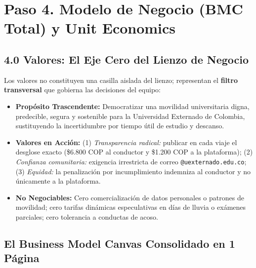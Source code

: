 \documentclass[11pt,a4paper]{article}
\begin{document}
\vspace{0.3cm}

\section{Paso 4. Modelo de Negocio (BMC Total) y Unit Economics}

\subsection{4.0 Valores: El Eje Cero del Lienzo de Negocio}

Los valores no constituyen una casilla aislada del lienzo; representan el \textbf{filtro transversal} que gobierna las decisiones del equipo:
\begin{itemize}[leftmargin=*]
    \item \textbf{Prop\'osito Trascendente:} Democratizar una movilidad universitaria digna, predecible, segura y sostenible para la Universidad Externado de Colombia, sustituyendo la incertidumbre por tiempo \'util de estudio y descanso.
    \item \textbf{Valores en Acci\'on:} (1) \textit{Transparencia radical:} publicar en cada viaje el desglose exacto (\$6.800 COP al conductor y \$1.200 COP a la plataforma); (2) \textit{Confianza comunitaria:} exigencia irrestricta de correo \texttt{@uexternado.edu.co}; (3) \textit{Equidad:} la penalizaci\'on por incumplimiento indemniza al conductor y no \'unicamente a la plataforma.
    \item \textbf{No Negociables:} Cero comercializaci\'on de datos personales o patrones de movilidad; cero tarifas din\'amicas especulativas en d\'ias de lluvia o ex\'amenes parciales; cero tolerancia a conductas de acoso.
\end{itemize}

\subsection{El Business Model Canvas Consolidado en 1 P\'agina}
\end{document}
